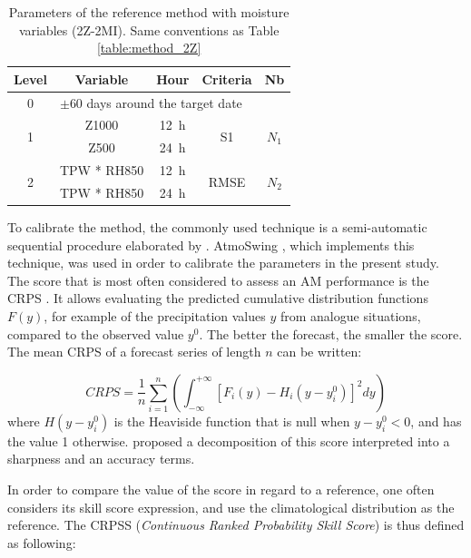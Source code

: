\documentclass[hess]{copernicus}
\begin{document}
\begin{table}[htb]
	\caption{Parameters of the reference method with moisture variables (2Z-2MI). Same conventions as Table \ref{table:method_2Z}}
	\footnotesize
	\begin{center}
		\begin{tabular}{ccccc}
			\hline 
			Level & Variable & Hour & Criteria & Nb \\ 
			\hline 
			0 & \multicolumn{4}{l}{$\pm 60$ days around the target date} \\
			\hline 
			\multirow{2}{*}{1} & Z1000 & 12~h & \multirow{2}{*}{S1} & \multirow{2}{*}{$N_{1}$} \\
			& Z500 & 24~h & & \\ 
			\hline
			\multirow{2}{*}{2} & TPW * RH850 & 12~h & \multirow{2}{*}{RMSE} & \multirow{2}{*}{$N_{2}$} \\
			& TPW * RH850 & 24~h & & \\ 
			\hline 
		\end{tabular} 
	\end{center}
	\label{table:method_2Z-2MI}
\end{table}

To calibrate the method, the commonly used technique is a semi-automatic sequential procedure elaborated by \citet{Bontron2004}. AtmoSwing \citep{Horton2016}, which implements this technique, was used in order to calibrate the parameters in the present study. The score that is most often considered to assess an AM performance is the CRPS \citep[Continuous Ranked Probability Score,][]{Brown1974, Matheson1976, Hersbach2000}. It allows evaluating the predicted cumulative distribution functions $F(y)$, for example of the precipitation values $y$ from analogue situations, compared to the observed value $y^{0}$. The better the forecast, the smaller the score. The mean CRPS of a forecast series of length $n$ can be written:

\begin{equation}
\label{eq:CRPS}
CRPS = \frac{1}{n} \sum_{i=1}^{n} \left(  \int_{-\infty}^{+\infty} \left[ F_{i}(y)-H_{i}(y-y_{i}^{0})\right]^{2} dy \right) 
\end{equation}
where $H(y-y_{i}^{0})$ is the Heaviside function that is null when $y-y_{i}^{0}<0$, and has the value 1 otherwise. \citet{Bontron2004} proposed a decomposition of this score interpreted into a sharpness and an accuracy terms.

In order to compare the value of the score in regard to a reference, one often considers its skill score expression, and use the climatological distribution as the reference. The CRPSS (\textit{Continuous Ranked Probability Skill Score}) is thus defined as following:
\end{document}
